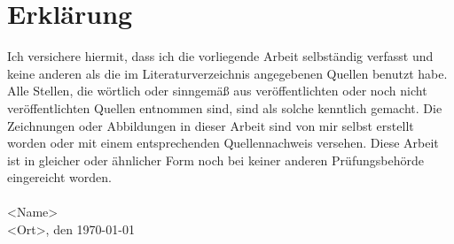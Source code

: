 \chapter{Erklärung}
Ich versichere hiermit, dass ich die vorliegende Arbeit selbständig verfasst und keine anderen als die im Literaturverzeichnis angegebenen Quellen benutzt habe.
Alle Stellen, die wörtlich oder sinngemäß aus veröffentlichten oder noch nicht veröffentlichten Quellen entnommen sind, sind als solche kenntlich gemacht.
Die Zeichnungen oder Abbildungen in dieser Arbeit sind von mir selbst erstellt worden oder mit einem entsprechenden Quellennachweis versehen.
Diese Arbeit ist in gleicher oder ähnlicher Form noch bei keiner anderen
Prüfungsbehörde eingereicht worden.\\\\

<Name>\\
<Ort>, den \today\\